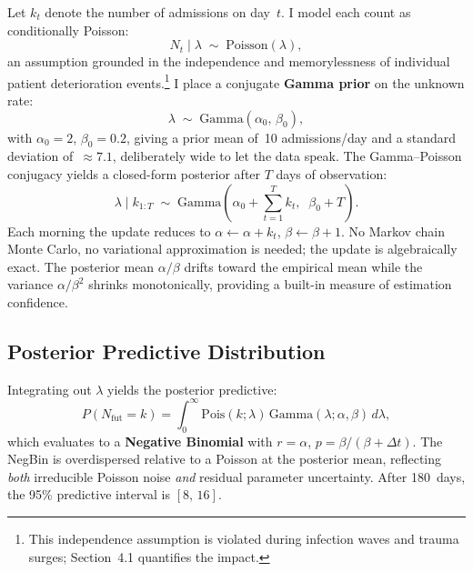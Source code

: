 \documentclass[10pt, twocolumn]{article}
\begin{document}
Let $k_t$ denote the number of admissions on day~$t$. I model each
count as conditionally Poisson:
\begin{equation}\label{eq:likelihood}
    N_t \mid \lambda \;\sim\; \mathrm{Poisson}(\lambda),
\end{equation}
an assumption grounded in the independence and memorylessness of
individual patient deterioration events.\footnote{This independence
assumption is violated during infection waves and trauma surges;
Section~4.1 quantifies the impact.} I place a conjugate
\textbf{Gamma prior} on the unknown rate:
\begin{equation}\label{eq:prior}
    \lambda \;\sim\; \mathrm{Gamma}(\alpha_0,\, \beta_0),
\end{equation}
with $\alpha_0 = 2$, $\beta_0 = 0.2$, giving a prior mean of~10
admissions/day and a standard deviation of~$\approx 7.1$, deliberately
wide to let the data speak. The Gamma--Poisson conjugacy yields a
closed-form posterior after $T$ days of observation:
\begin{equation}\label{eq:posterior}
    \lambda \mid k_{1:T} \;\sim\; \mathrm{Gamma}\!\left(
        \alpha_0 + \textstyle\sum_{t=1}^T k_t,\;\;
        \beta_0 + T
    \right).
\end{equation}
Each morning the update reduces to $\alpha \leftarrow \alpha + k_t$,
$\beta \leftarrow \beta + 1$. No Markov chain Monte Carlo, no
variational approximation is needed; the update is algebraically exact.
The posterior mean $\alpha/\beta$ drifts toward the empirical mean while
the variance $\alpha/\beta^2$ shrinks monotonically, providing a
built-in measure of estimation confidence.

\subsection{Posterior Predictive Distribution}

Integrating out $\lambda$ yields the posterior predictive:
\begin{equation}\label{eq:predpred}
    P(N_{\text{fut}} = k) = \int_0^\infty \!\mathrm{Pois}(k;\lambda)
    \, \mathrm{Gamma}(\lambda;\alpha,\beta)\, d\lambda,
\end{equation}
which evaluates to a \textbf{Negative Binomial} with $r = \alpha$,
$p = \beta/(\beta + \Delta t)$. The NegBin is overdispersed relative
to a Poisson at the posterior mean, reflecting \emph{both} irreducible
Poisson noise \emph{and} residual parameter uncertainty. After
180~days, the 95\% predictive interval is $[8,\, 16]$.
\end{document}
